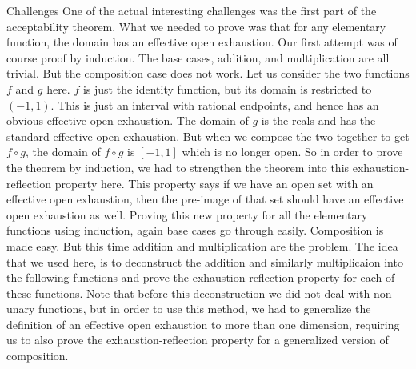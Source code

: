 \begin{frame}{Challenges}
{    \footnotesize One of the actual interesting challenges was the first part of the acceptability theorem. What we needed to prove was that for any elementary function, the domain has an effective open exhaustion. Our first attempt was of course proof by induction. The base cases, addition, and multiplication are all trivial. But the composition case does not work. Let us consider the two functions $f$ and $g$ here. $f$ is just the identity function, but its domain is restricted to $(-1,1)$. This is just an interval with rational endpoints, and hence has an obvious effective open exhaustion. The domain of $g$ is the reals and has the standard effective open exhaustion. But when we compose the two together to get $f\circ g$, the domain of $f\circ g$ is $[-1,1]$ which is no longer open. So in order to prove the theorem by induction, we had to strengthen the theorem into this exhaustion-reflection property here. This property says if we have an open set with an effective open exhaustion, then the pre-image of that set should have an effective open exhaustion as well. Proving this new property for all the elementary functions using induction, again base cases go through easily. Composition is made easy. But this time addition and multiplication are the problem. The idea that we used here, is to deconstruct the addition and similarly multiplicaion into the following functions and prove the exhaustion-reflection property for each of these functions. Note that before this deconstruction we did not deal with non-unary functions, but in order to use this method, we had to generalize the definition of an effective open exhaustion to more than one dimension, requiring us to also prove the exhaustion-reflection property for a generalized version of composition. }
\end{frame}